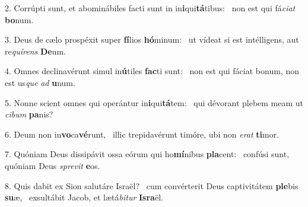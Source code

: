 2. Corrúpti sunt, et abominábiles facti sunt in in\textbf{i}qui\textbf{tá}tibus: \ast\  non est qui fá\textit{ci}\textit{at} \textbf{bo}num.\

3. Deus de cælo prospéxit super \textbf{fí}lios \textbf{hó}minum: \ast\  ut vídeat si est intélligens, aut re\textit{quí}\textit{rens} \textbf{De}um.\

4. Omnes declinavérunt simul in\textbf{ú}tiles \textbf{fac}ti sunt: \ast\  non est qui fáciat bonum, non est us\textit{que} \textit{ad} \textbf{u}num.\

5. Nonne scient omnes qui operántur in\textbf{i}qui\textbf{tá}tem: \ast\  qui dévorant plebem meam ut \textit{ci}\textit{bum} \textbf{pa}nis?\

6. Deum non in\textbf{vo}ca\textbf{vé}runt, \ast\  illic trepidavérunt timóre, ubi non \textit{e}\textit{rat} \textbf{ti}mor.\

7. Quóniam Deus dissipávit ossa eórum qui ho\textbf{mí}nibus \textbf{pla}cent: \ast\  confúsi sunt, quóniam Deus \textit{spre}\textit{vit} \textbf{e}os.\

8. Quis dabit ex Sion salutáre Israël? \dag\  cum convérterit Deus captivitátem \textbf{ple}bis \textbf{su}æ, \ast\  exsultábit Jacob, et lætá\textit{bi}\textit{tur} \textbf{Is}\textbf{ra}ël.\

